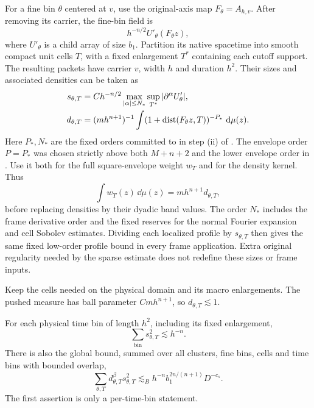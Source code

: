 For a fine bin $\theta$ centered at $v$, use the original-axis map
$F_\theta=A_{h,v}$.  After removing its carrier, the fine-bin field is
\[
 h^{-n/2}U'_\theta(F_\theta z),
\]
where $U'_\theta$ is a child array of size $b_1$.  Partition its native
spacetime into smooth compact unit cells $T$, with a fixed enlargement
$T^*$ containing each cutoff support.  The resulting packets have
carrier $v$, width $h$ and duration $h^2$.  Their sizes and associated
densities can be taken as
\begin{align}
 s_{\theta,T}&=Ch^{-n/2}\max_{|\alpha|\leq N_*}
                     \sup_{T^*}|\partial^\alpha U'_\theta|,
                     \label{w:eq-flatsize}\\
 d_{\theta,T}&=(mh^{n+1})^{-1}
  \int(1+\operatorname{dist}(F_\theta z,T))^{-P_*}\,\,\mathrm d\mu(z).
                     \label{w:eq-flatdensity}
\end{align}
Here $P_*,N_*$ are the fixed orders committed to in step
\textup{(ii)} of .  The envelope order $P=P_*$ was
chosen strictly above both $M+n+2$ and the lower envelope order in
.  Use it both for the full square-envelope weight
$w_T$ and for the density kernel.  Thus
\[
 \int w_T(z)\,\dd\mu(z)=mh^{n+1}d_{\theta,T},
\]
before replacing densities by their dyadic band values.  The order
$N_*$ includes the frame derivative order and the fixed reserves for the
normal Fourier expansion and cell Sobolev estimates.  Dividing each
localized profile by $s_{\theta,T}$ then gives the same fixed
low-order profile bound in every frame application.  Extra original
regularity needed by the sparse estimate does not redefine these
sizes or frame inputs.

Keep the cells needed on the physical domain and its macro
enlargements.  The pushed measure has ball parameter $Cmh^{n+1}$, so
$d_{\theta,T}\lesssim1$.

\begin{lemma}\label{w:flatten}
For each physical time bin of length $h^2$, including its fixed
enlargement,
\begin{equation}\label{w:eq-flat-unweighted}
 \sum_{\mathrm{bin}}s_{\theta,T}^2\lesssim h^{-n}.
\end{equation}
There is also the global bound, summed over all clusters, fine bins,
cells and time bins with bounded overlap,
\begin{equation}\label{w:eq-flat-weighted}
 \sum_{\theta,T}d_{\theta,T}^{\beta}s_{\theta,T}^2
 \lesssim_B h^{-n}b_1^{2n/(n+1)}D^{-c_s}.
\end{equation}
The first assertion is only a per-time-bin statement.
\end{lemma}

